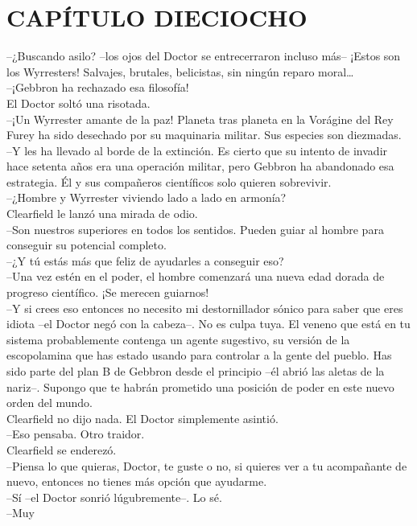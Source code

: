 \chapter*{CAPÍTULO DIECIOCHO}
--¿Buscando asilo? --los ojos del Doctor se entrecerraron incluso más--
¡Estos son los Wyrresters! Salvajes, brutales, belicistas, sin ningún
reparo moral\ldots{}\\
--¡Gebbron ha rechazado esa filosofía!\\
El Doctor soltó una risotada.\\
--¡Un Wyrrester amante de la paz! Planeta tras planeta en la Vorágine
del Rey Furey ha sido desechado por su maquinaria militar. Sus especies
son diezmadas.\\
--Y les ha llevado al borde de la extinción. Es cierto que su intento de
invadir hace setenta años era una operación militar, pero Gebbron ha
abandonado esa estrategia. Él y sus compañeros científicos solo quieren
sobrevivir.\\
--¿Hombre y Wyrrester viviendo lado a lado en armonía?\\
Clearfield le lanzó una mirada de odio.\\
--Son nuestros superiores en todos los sentidos. Pueden guiar al hombre
para conseguir su potencial completo.\\
--¿Y tú estás más que feliz de ayudarles a conseguir eso?\\
--Una vez estén en el poder, el hombre comenzará una nueva edad dorada
de progreso científico. ¡Se merecen guiarnos!\\
--Y si crees eso entonces no necesito mi destornillador sónico para
saber que eres idiota --el Doctor negó con la cabeza--. No es culpa
tuya. El veneno que está en tu sistema probablemente contenga un agente
sugestivo, su versión de la escopolamina que has estado usando para
controlar a la gente del pueblo. Has sido parte del plan B de Gebbron
desde el principio --él abrió las aletas de la nariz--. Supongo que te
habrán prometido una posición de poder en este nuevo orden del mundo.\\
Clearfield no dijo nada. El Doctor simplemente asintió.\\
--Eso pensaba. Otro traidor.\\
Clearfield se enderezó.\\
--Piensa lo que quieras, Doctor, te guste o no, si quieres ver a tu
acompañante de nuevo, entonces no tienes más opción que ayudarme.\\
--Sí --el Doctor sonrió lúgubremente--. Lo sé.\\[2\baselineskip]--Muy
